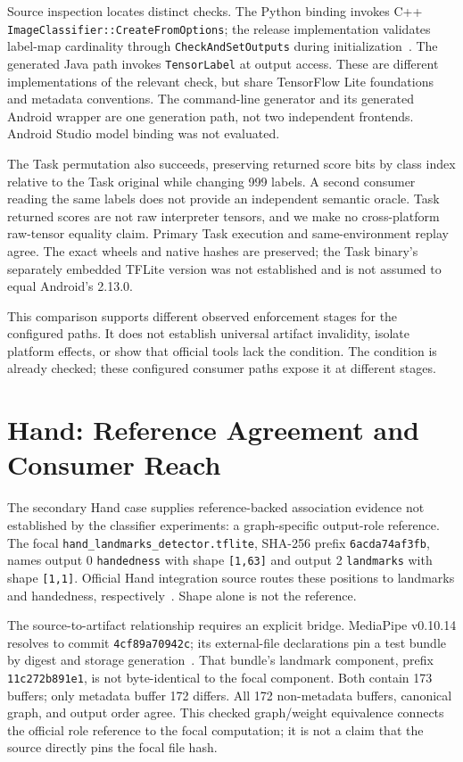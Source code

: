 \documentclass[10pt,twocolumn,letterpaper]{article}
\newcommand{\code}[1]{\texttt{#1}}
\begin{document}
Source inspection locates distinct checks. The Python binding invokes C++ \code{ImageClassifier::CreateFromOptions}; the release implementation validates label-map cardinality through \code{CheckAndSetOutputs} during initialization~\cite{task-classifier}. The generated Java path invokes \code{TensorLabel} at output access. These are different implementations of the relevant check, but share TensorFlow Lite foundations and metadata conventions. The command-line generator and its generated Android wrapper are one generation path, not two independent frontends. Android Studio model binding was not evaluated.

The Task permutation also succeeds, preserving returned score bits by class index relative to the Task original while changing 999 labels. A second consumer reading the same labels does not provide an independent semantic oracle. Task returned scores are not raw interpreter tensors, and we make no cross-platform raw-tensor equality claim. Primary Task execution and same-environment replay agree. The exact wheels and native hashes are preserved; the Task binary's separately embedded TFLite version was not established and is not assumed to equal Android's 2.13.0.

This comparison supports different observed enforcement stages for the configured paths. It does not establish universal artifact invalidity, isolate platform effects, or show that official tools lack the condition. The condition is already checked; these configured consumer paths expose it at different stages.

\section{Hand: Reference Agreement and Consumer Reach}
\label{sec:hand}
The secondary Hand case supplies reference-backed association evidence not established by the classifier experiments: a graph-specific output-role reference. The focal \code{hand\_landmarks\_detector.tflite}, SHA-256 prefix \code{6acda74af3fb}, names output 0 \code{handedness} with shape \code{[1,63]} and output 2 \code{landmarks} with shape \code{[1,1]}. Official Hand integration source routes these positions to landmarks and handedness, respectively~\cite{hand-graph}. Shape alone is not the reference.

The source-to-artifact relationship requires an explicit bridge. MediaPipe v0.10.14 resolves to commit \code{4cf89a70942c}; its external-file declarations pin a test bundle by digest and storage generation~\cite{hand-assets}. That bundle's landmark component, prefix \code{11c272b891e1}, is not byte-identical to the focal component. Both contain 173 buffers; only metadata buffer 172 differs. All 172 non-metadata buffers, canonical graph, and output order agree. This checked graph/weight equivalence connects the official role reference to the focal computation; it is not a claim that the source directly pins the focal file hash.
\end{document}
